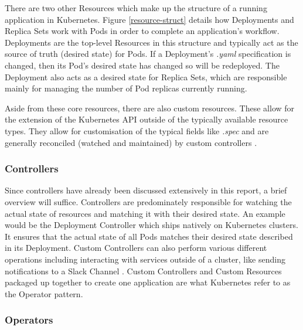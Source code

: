 \documentclass{article}
\begin{document}
There are two other Resources which make up the structure of a running application in Kubernetes. Figure \ref{resource-struct} \cite{k8s-rolling} details how Deployments and Replica Sets work with Pods in order to complete an application's workflow. Deployments are the top-level Resources in this structure and typically act as the source of truth (desired state) for Pods. If a Deployment's \emph{.yaml} specification is changed, then its Pod's desired state has changed so will be redeployed. The Deployment also acts as a desired state for Replica Sets, which are responsible mainly for managing the number of Pod replicas currently running. \\\par Aside from these core resources, there are also custom resources. These allow for the extension of the Kubernetes API outside of the typically available resource types. They allow for customisation of the typical fields like \emph{.spec} and are generally reconciled (watched and maintained) by custom controllers \cite{cust-res}. 



\subsubsection{Controllers} \label{controllers}

Since controllers have already been discussed extensively in this report, a brief overview will suffice. Controllers are predominately responsible for watching the actual state of resources and matching it with their desired state. An example would be the Deployment Controller which ships natively on Kubernetes clusters. It ensures that the actual state of all Pods matches their desired state described in its Deployment. Custom Controllers can also perform various different operations including interacting with services outside of a cluster, like sending notifications to a Slack Channel \cite{ctrlrs-ref}. Custom Controllers and Custom Resources packaged up together to create one application are what Kubernetes refer to as the Operator pattern.


\subsubsection{Operators}
\end{document}
